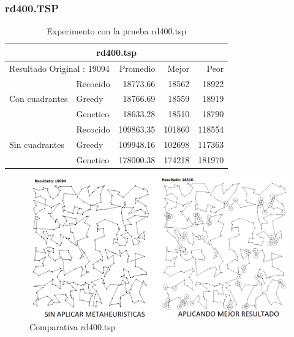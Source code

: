 \subsubsection{rd400.TSP}
\begin{table}[hbtp]
 \centering 
	\begin{tabular}{ | l   l | r | r | r |   }
        \hline\multicolumn{5}{|c|}{ \rowcolor[gray]{0.8}rd400.tsp } \\\hline
         \multicolumn{2}{|l|}{Resultado Original : 19094} & Promedio & Mejor & Peor \\ \hline
                        & Recocido  & 18773.66 & 18562 & 18922  \\ 
         Con cuadrantes & Greedy    & 18766.69 & 18559 & 18919  \\ 
                        & Genetico  & 18633.28 & 18510 & 18790  \\ \hline
                        & Recocido  & 109863.35 & 101860 & 118554   \\ 
         Sin cuadrantes & Greedy    & 109948.16 & 102698 & 117363   \\ 
                        & Genetico  & 178000.38 & 174218 & 181970   \\ \hline
    \end{tabular}
    \caption{Experimento con la prueba rd400.tsp}
    \label{table:EXP_rd400.tsp}
\end{table}
\begin{figure}[hbtp]
    \centering
        \includegraphics[width=1\textwidth]{PruebasResultados/Experimentos_Comparativas/rd400.png}
        \caption{Comparativa rd400.tsp}
        \label{fig:rd400_comparativa.png}
\end{figure}
